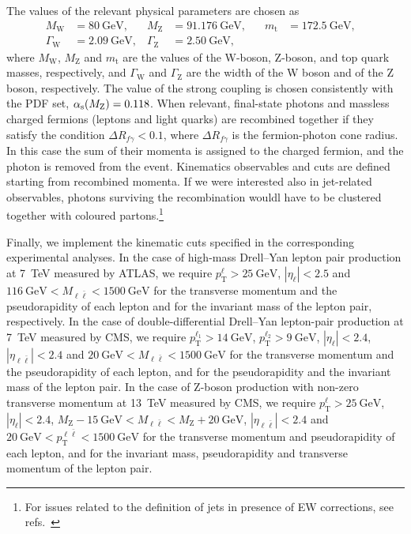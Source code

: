 The values of the relevant physical parameters are chosen as
\begin{equation}
\begin{aligned}
M_\mathrm{W} &= \SI{80}{\giga\electronvolt} \text{,} \quad &
M_\mathrm{Z} &= \SI{91.176}{\giga\electronvolt} \text{,} \quad &
m_\mathrm{t} &= \SI{172.5}{\giga\electronvolt} \text{,} \quad \\
\Gamma_\mathrm{W} &= \SI{2.09}{\giga\electronvolt} \text{,} &
\Gamma_\mathrm{Z} &= \SI{2.50}{\giga\electronvolt} \text{,}
\end{aligned}
\label{eq:parameters}
\end{equation}
where $M_\mathrm{W}$, $M_\mathrm{Z}$ and $m_\mathrm{t}$ are the values of the W-boson, Z-boson, and
top quark masses, respectively, and $\Gamma_\mathrm{W}$ and $\Gamma_\mathrm{Z}$ are the width of
the W boson and of the Z boson, respectively. The value of the strong
coupling is chosen consistently with the PDF set, $\alpha_\mathrm{s}(M_\mathrm{Z})=0.118$.
When relevant, final-state photons and massless charged fermions (leptons and light quarks) are recombined together 
if they satisfy the condition $\Delta R_{f \gamma}<0.1$, where $\Delta R_{f \gamma}$
is the fermion-photon cone radius. In this case the
sum of their momenta is assigned to the charged fermion, and the photon is removed
from the event. Kinematics observables and cuts are defined starting from recombined momenta. If we were interested also in jet-related observables,
photons surviving the recombination wouldl have to be clustered together with coloured
partons.\footnote{For issues related to the definition of jets in presence of EW corrections,
    see refs.~\cite{Frederix:2016ost,Denner:2019zfp}} 
    
Finally, we implement the kinematic cuts specified in the corresponding
experimental analyses. In the case of high-mass Drell--Yan lepton pair
production at \SI{7}{\tera\electronvolt} measured by ATLAS, we require $p_\mathrm{T}^\ell>\SI{25}{\giga\electronvolt}$,
$|\eta_\ell|<2.5$ and $\SI{116}{\giga\electronvolt}<M_{\ell\bar\ell}<\SI{1500}{\giga\electronvolt}$ for the transverse
momentum and the pseudorapidity of each lepton and for the invariant mass of the
lepton pair, respectively. In the case of double-differential Drell--Yan
lepton-pair production
at \SI{7}{\tera\electronvolt} measured by CMS, we require $p_\mathrm{T}^{\ell_1}>\SI{14}{\giga\electronvolt}$, $p_\mathrm{T}^{\ell_2}>\SI{9}{\giga\electronvolt}$,
$|\eta_\ell|<2.4$, $|\eta_{\ell\bar\ell}|<2.4$ and $\SI{20}{\giga\electronvolt}<M_{\ell\bar\ell}<\SI{1500}{\giga\electronvolt}$
for the transverse momentum and the pseudorapidity of each lepton, and for the
pseudorapidity and the invariant mass of the lepton pair. In the case of Z-boson
production with non-zero transverse momentum at \SI{13}{\tera\electronvolt} measured by CMS, we
require $p_\mathrm{T}^\ell>\SI{25}{\giga\electronvolt}$, $|\eta_\ell|<2.4$,
$M_\mathrm{Z}-\SI{15}{\giga\electronvolt}<M_{\ell\bar\ell}<M_\mathrm{Z}+\SI{20}{\giga\electronvolt}$,
$|\eta_{\ell\bar\ell}|<2.4$ and $\SI{20}{\giga\electronvolt}<p_\mathrm{T}^{\ell\bar\ell}<\SI{1500}{\giga\electronvolt}$ for the
transverse momentum and pseudorapidity of each lepton, and for the invariant mass,
pseudorapidity and transverse momentum of the lepton pair.


